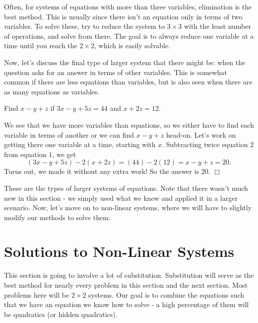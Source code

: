 \documentclass[../book.tex]{subfiles}
\begin{document}
Often, for systems of equations with more than three variables, elimination is the best method.  This is usually since there isn't an equation only in terms of two variables.  To solve these, try to reduce the system to $3\times 3$ with the least number of operations, and solve from there.  The goal is to always reduce one variable at a time until you reach the $2\times 2$, which is easily solvable.

Now, let's discuss the final type of larger system that there might be: when the question asks for an answer in terms of other variables.  This is somewhat common if there are less equations than variables, but is also seen when there are as many equations as variables.
\begin{example}
Find $x-y+z$ if $3x-y+5z=44$ and $x+2z=12$.
\end{example}
\begin{solution}
We see that we have more variables than equations, so we either have to find each variable in terms of another or we can find $x-y+z$ head-on.  Let's work on getting there one variable at a time, starting with $x$.  Subtracting twice equation $2$ from equation $1$, we get $$(3x-y+5z)-2(x+2z)=(44)-2(12)=x-y+z=20.$$  Turns out, we made it without any extra work!  So the answer is $20$.  $\Box$
\end{solution}
These are the types of larger systems of equations.  Note that there wasn't much new in this section - we simply used what we knew and applied it in a larger scenario.  Now, let's move on to non-linear systems, where we will have to slightly modify our methods to solve them.
\section{Solutions to Non-Linear Systems}
This section is going to involve a lot of substitution.  Substitution will serve as the best method for nearly every problem in this section and the next section.  Most problems here will be $2\times 2$ systems.  Our goal is to combine the equations such that we have an equation we know how to solve - a high percentage of them will be quadratics (or hidden quadratics).  
\end{document}
